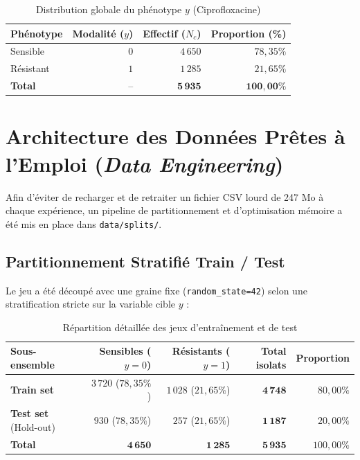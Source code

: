 \documentclass[11pt,a4paper]{article}
\begin{document}
\begin{table}[h!]
\centering
\caption{Distribution globale du phénotype $y$ (Ciprofloxacine)}
\vspace{0.2cm}
\begin{tabular}{lrrr}
\toprule
\textbf{Phénotype} & \textbf{Modalité ($y$)} & \textbf{Effectif ($N_c$)} & \textbf{Proportion (\%)} \\
\midrule
Sensible & $0$ & $4\,650$ & $78,35\%$ \\
Résistant & $1$ & $1\,285$ & $21,65\%$ \\
\midrule
\textbf{Total} & -- & $\mathbf{5\,935}$ & $\mathbf{100,00\%}$ \\
\bottomrule
\end{tabular}
\label{tab:target_distribution}
\end{table}

\section{Architecture des Données Prêtes à l'Emploi (\textit{Data Engineering})}

Afin d'éviter de recharger et de retraiter un fichier CSV lourd de 247 Mo à chaque expérience, un pipeline de partitionnement et d'optimisation mémoire a été mis en place dans \texttt{data/splits/}.

\subsection{Partitionnement Stratifié Train / Test}

Le jeu a été découpé avec une graine fixe (\texttt{random\_state=42}) selon une stratification stricte sur la variable cible $y$ \citep{hastie2009elements} :

\begin{table}[h!]
\centering
\small
\caption{Répartition détaillée des jeux d'entraînement et de test}
\vspace{0.2cm}
\begin{tabular}{lrrrr}
\toprule
\textbf{Sous-ensemble} & \textbf{Sensibles ($y=0$)} & \textbf{Résistants ($y=1$)} & \textbf{Total isolats} & \textbf{Proportion} \\
\midrule
\textbf{Train set} & $3\,720$ ($78,35\%$) & $1\,028$ ($21,65\%$) & $\mathbf{4\,748}$ & $80,00\%$ \\
\textbf{Test set} (Hold-out) & $930$ ($78,35\%$) & $257$ ($21,65\%$) & $\mathbf{1\,187}$ & $20,00\%$ \\
\midrule
\textbf{Total} & $\mathbf{4\,650}$ & $\mathbf{1\,285}$ & $\mathbf{5\,935}$ & $100,00\%$ \\
\bottomrule
\end{tabular}
\label{tab:splits}
\end{table}
\end{document}
